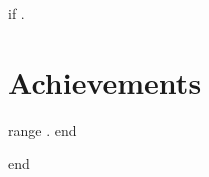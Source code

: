 {{if .}}
\section{Achievements}
    \resumeSubHeadingListStart
    
     \vspace{-5pt}

            \resumeItemListStart
            {{range .}}
                {{end}}
            \resumeItemListEnd
        
    \resumeSubHeadingListEnd
{{end}}